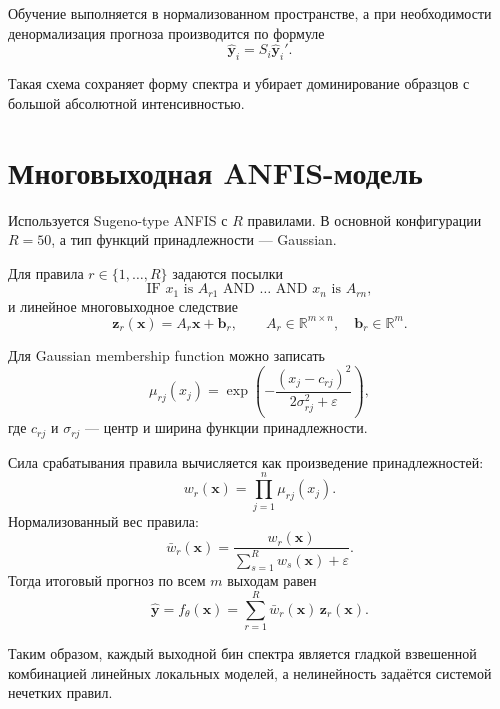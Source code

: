 \documentclass[11pt]{article}
\begin{document}
Обучение выполняется в нормализованном пространстве, а при необходимости денормализация прогноза производится по формуле
\begin{equation}
\hat{\mathbf{y}}_i = S_i \hat{\mathbf{y}}_i'.
\end{equation}

Такая схема сохраняет форму спектра и убирает доминирование образцов с большой абсолютной интенсивностью.

\section{Многовыходная ANFIS-модель}

Используется Sugeno-type ANFIS с $R$ правилами. В основной конфигурации $R=50$, а тип функций принадлежности --- Gaussian.

Для правила $r \in \{1,\dots,R\}$ задаются посылки
\begin{equation}
\text{IF } x_1 \text{ is } A_{r1}
\text{ AND } \dots \text{ AND } x_n \text{ is } A_{rn},
\end{equation}
и линейное многовыходное следствие
\begin{equation}
\mathbf{z}_r(\mathbf{x}) = A_r \mathbf{x} + \mathbf{b}_r,
\qquad
A_r \in \mathbb{R}^{m \times n},
\quad
\mathbf{b}_r \in \mathbb{R}^{m}.
\end{equation}

Для Gaussian membership function можно записать
\begin{equation}
\mu_{rj}(x_j) = \exp\!\left(-\frac{(x_j-c_{rj})^2}{2\sigma_{rj}^2 + \varepsilon}\right),
\end{equation}
где $c_{rj}$ и $\sigma_{rj}$ --- центр и ширина функции принадлежности.

Сила срабатывания правила вычисляется как произведение принадлежностей:
\begin{equation}
 w_r(\mathbf{x}) = \prod_{j=1}^{n} \mu_{rj}(x_j).
\end{equation}
Нормализованный вес правила:
\begin{equation}
\bar{w}_r(\mathbf{x}) = \frac{w_r(\mathbf{x})}{\sum_{s=1}^{R} w_s(\mathbf{x}) + \varepsilon}.
\end{equation}
Тогда итоговый прогноз по всем $m$ выходам равен
\begin{equation}
\hat{\mathbf{y}} = f_{\theta}(\mathbf{x}) = \sum_{r=1}^{R} \bar{w}_r(\mathbf{x}) \, \mathbf{z}_r(\mathbf{x}).
\end{equation}

Таким образом, каждый выходной бин спектра является гладкой взвешенной комбинацией линейных локальных моделей, а нелинейность задаётся системой нечетких правил.
\end{document}
